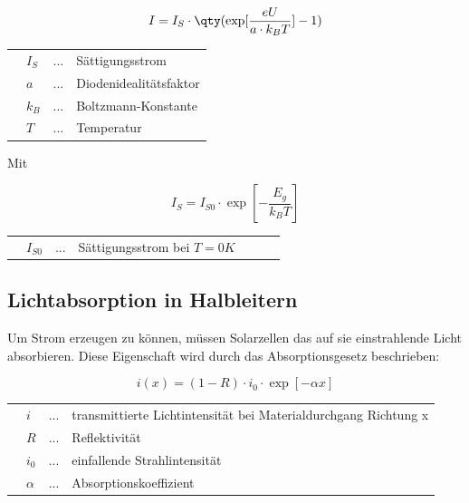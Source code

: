 \documentclass[slug=SZ, room=Hermann-Krone-Bau\,\ Labor\ 1.25,
supervisor=Martin\ Kroll, coursedate=14.\ 11.\ 2019]{../../Lab_Report_LaTeX/lab_report}
\begin{document}
\begin{equation}\label{eq:shockley}
        I = I_S \cdot \qty(\exp[\frac{eU}{a \cdot k_B T}]-1)
\end{equation}

\begin{tabular}{llll}
         & \(I_S\) & ... & Sättigungsstrom        \\
         & \(a\)   & ... & Diodenidealitätsfaktor \\
         & \(k_B\) & ... & Boltzmann-Konstante    \\
         & \(T\)   & ... & Temperatur
\end{tabular}

\newpage

Mit

\begin{equation}\label{eq:sattigstrom}
        I_S = I_{S0} \cdot \exp[-\frac{E_g}{k_B T}]
\end{equation}

\begin{tabular}{lllllll}
         & \(I_{S0}\) & ... & Sättigungsstrom bei \(T=0 K\) &
\end{tabular}

\subsection{Lichtabsorption in Halbleitern}
\label{sec:absorp}

Um Strom erzeugen zu können, müssen Solarzellen das auf sie einstrahlende Licht absorbieren.
Diese Eigenschaft wird durch das Absorptionsgesetz beschrieben:

\begin{equation}\label{eq:absorp}
        i(x) = (1-R) \cdot i_0 \cdot \exp[-\alpha x]
\end{equation}

\begin{tabular}{llll}
         & \(i\)      & ... & transmittierte Lichtintensität bei Materialdurchgang Richtung x \\
         & \(R\)      & ... & Reflektivität                                                   \\
         & \(i_0\)    & ... & einfallende Strahlintensität                                    \\
         & \(\alpha\) & ... & Absorptionskoeffizient
\end{tabular}\\ \\
\end{document}
